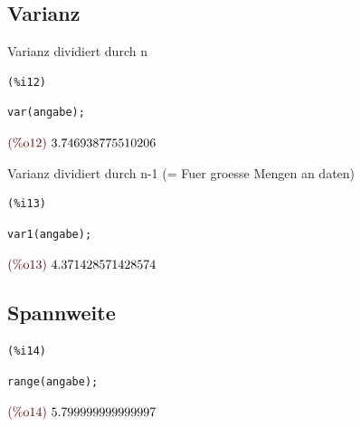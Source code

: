 \documentclass{article}
\begin{document}
\subsection{Varianz}


Varianz dividiert durch n

\noindent
\begin{minipage}[t]{8ex}{\color{red}\bf
\begin{verbatim}
(%i12) 
\end{verbatim}}
\end{minipage}
\begin{minipage}[t]{\textwidth}{\color{blue}
\begin{verbatim}
var(angabe);
\end{verbatim}}
\end{minipage}
\begin{math}\displaystyle
\parbox{8ex}{\color{labelcolor}(\%o12) }
3.746938775510206
\end{math}

Varianz dividiert durch n-1 (= Fuer groesse Mengen an daten)

\noindent
\begin{minipage}[t]{8ex}{\color{red}\bf
\begin{verbatim}
(%i13) 
\end{verbatim}}
\end{minipage}
\begin{minipage}[t]{\textwidth}{\color{blue}
\begin{verbatim}
var1(angabe);
\end{verbatim}}
\end{minipage}
\begin{math}\displaystyle
\parbox{8ex}{\color{labelcolor}(\%o13) }
4.371428571428574
\end{math}


\subsection{Spannweite}



\noindent
\begin{minipage}[t]{8ex}{\color{red}\bf
\begin{verbatim}
(%i14) 
\end{verbatim}}
\end{minipage}
\begin{minipage}[t]{\textwidth}{\color{blue}
\begin{verbatim}
range(angabe);
\end{verbatim}}
\end{minipage}
\begin{math}\displaystyle
\parbox{8ex}{\color{labelcolor}(\%o14) }
5.799999999999997
\end{math}
\end{document}
